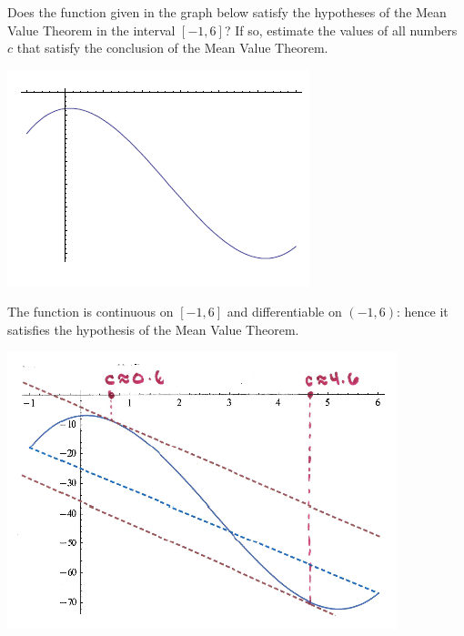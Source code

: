 \documentclass[nooutcomes]{ximera}
\begin{document}
\begin{problem}
  Does the function given in the graph below satisfy the hypotheses of the Mean Value Theorem in the interval $[-1,6]$?
  If so, estimate the values of all numbers $c$ that satisfy the conclusion of the Mean Value Theorem.  
  \begin{image}
    \includegraphics[scale=0.6]{Images/figure1.png}
  \end{image}
  \begin{freeResponse}
    The function is continuous on $[-1,6]$ and differentiable on $(-1,6)$: hence it satisfies the hypothesis of the Mean Value Theorem.
    \begin{image}
      \includegraphics[scale=0.6]{Images/Figure2.png}
    \end{image}
  \end{freeResponse}
\end{problem}
\end{document}
